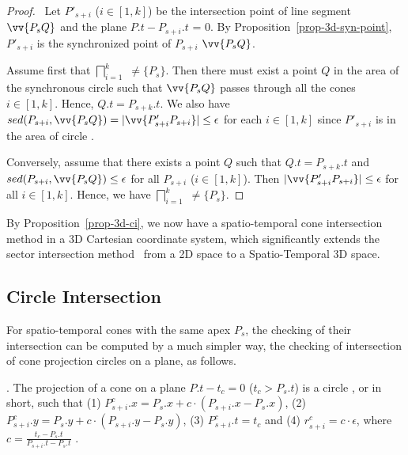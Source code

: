 \begin{proof}\
Let $P'_{s+i}$ ($i\in[1, k]$) be the intersection point of line segment $\vv{P_sQ}$ and the plane $P.t - P_{s+i}.t$ = $0$.
By Proposition~\ref{prop-3d-syn-point}, $P'_{s+i}$ is the synchronized point of $P_{s+i}$ \wrt $\vv{P_sQ}$.

Assume first that $\bigsqcap_{i=1}^{k}$ $\ne \{P_s\}$. Then there must exist a point $Q $ in the area of the  synchronous circle  such that $\vv{P_sQ}$ passes through all the cones  $i\in[1, k]$. Hence,  $Q.t = P_{s+k}.t$.
We also have $sed(P_{s+i}, \vv{P_sQ}) = |\vv{P'_{s+i}P_{s+i}}| \le \epsilon$ for each $i \in [1, k]$  since $P'_{s+i}$  is in the area of circle  \circle{(P_{s+i}, \epsilon)}.

Conversely, assume that there exists a point $Q$ such that $Q.t = P_{s+k}.t$ and $sed(P_{s+i}, \vv{P_sQ})\le\epsilon$ for all $P_{s+i}$ ($i \in [1,k]$). Then $|\vv{P'_{s+i}P_{s+i}}| \le \epsilon$ for all $i \in [1, k]$. Hence, we have  $\bigsqcap_{i=1}^{k}$ $\ne \{P_s\}$. \eop
\end{proof}

By Proposition~\ref{prop-3d-ci}, we now have a spatio-temporal cone intersection method in a 3D Cartesian coordinate system, which significantly extends the sector intersection method~\cite{Williams:Longest, Sklansky:Cone, Zhao:Sleeve} {from a 2D space to a Spatio-Temporal 3D space}.


\subsection{Circle Intersection}
\label{subsec-ProjectionCircle}

For spatio-temporal cones with the same apex $P_s$, the checking of their intersection can be computed by a much simpler way, \ie the checking of intersection of cone projection circles on a plane, as follows.

. The projection of a cone  on a plane $P.t- t_c = 0$ ($t_c > P_s.t$) is a circle , or  in short, such that
%
(1) $P^c_{s+i}.x = P_s.x +  c\cdot(P_{s+i}.x- P_{s}.x)$,
%
(2) $P^c_{s+i}.y = P_s.y +  c\cdot(P_{s+i}.y- P_{s}.y)$,
%
(3) $P^c_{s+i}.t = t_c$ and
%
(4) $r^c_{s+i} =c\cdot\epsilon$, where $c=\frac{t_c - P_s.t}{P_{s+i}.t - P_s.t}$ .


